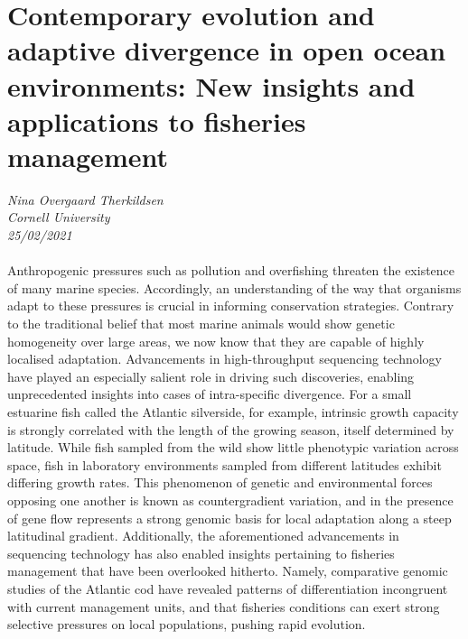 \documentclass[11pt]{article}
\begin{document}
\section{Contemporary evolution and adaptive divergence in open ocean environments: New insights and applications to fisheries management}
\textit{Nina Overgaard Therkildsen\\Cornell University\\25/02/2021}
\\
\\Anthropogenic pressures such as pollution and overfishing threaten the existence of many marine species. Accordingly, an understanding of the way that organisms adapt to these pressures is crucial in informing conservation strategies. Contrary to the traditional belief that most marine animals would show genetic homogeneity over large areas, we now know that they are capable of highly localised adaptation. Advancements in high-throughput sequencing technology have played an especially salient role in driving such discoveries, enabling unprecedented insights into cases of intra-specific divergence. For a small estuarine fish called the Atlantic silverside, for example, intrinsic growth capacity is strongly correlated with the length of the growing season, itself determined by latitude. While fish sampled from the wild show little phenotypic variation across space, fish in laboratory environments sampled from different latitudes exhibit differing growth rates. This phenomenon of genetic and environmental forces opposing one another is known as countergradient variation, and in the presence of gene flow represents a strong genomic basis for local adaptation along a steep latitudinal gradient. Additionally, the aforementioned advancements in sequencing technology has also enabled insights pertaining to fisheries management that have been overlooked hitherto. Namely, comparative genomic studies of the Atlantic cod have revealed patterns of differentiation incongruent with current management units, and that fisheries conditions can exert strong selective pressures on local populations, pushing rapid evolution.
\end{document}
